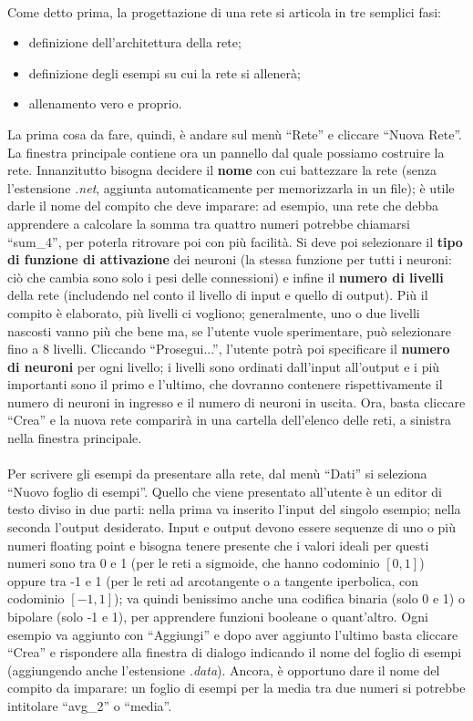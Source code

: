 \documentclass{article}
\begin{document}
\paragraph{} Come detto prima, la progettazione di una rete si articola in tre semplici fasi:
\begin{itemize}
	\item definizione dell'architettura della rete;
	\item definizione degli esempi su cui la rete si allenerà;
	\item allenamento vero e proprio.
\end{itemize}
La prima cosa da fare, quindi, è andare sul menù “Rete” e cliccare “Nuova Rete”. La finestra principale contiene ora un pannello dal quale possiamo costruire la rete. Innanzitutto bisogna decidere il \textbf{nome} con cui battezzare la rete (senza l'estensione \textit{.net}, aggiunta automaticamente per memorizzarla in un file); è utile darle il nome del compito che deve imparare: ad esempio, una rete che debba apprendere a calcolare la somma tra quattro numeri potrebbe chiamarsi “sum\_4”, per poterla ritrovare poi con più facilità. Si deve poi selezionare il \textbf{tipo di funzione di attivazione} dei neuroni (la stessa funzione per tutti i neuroni: ciò che cambia sono solo i pesi delle connessioni) e infine il \textbf{numero di livelli} della rete (includendo nel conto il livello di input e quello di output). Più il compito è elaborato, più livelli ci vogliono; generalmente, uno o due livelli nascosti vanno più che bene ma, se l'utente vuole sperimentare, può selezionare fino a 8 livelli. Cliccando “Prosegui...”, l'utente potrà poi specificare il \textbf{numero di neuroni} per ogni livello; i livelli sono ordinati dall'input all'output e i più importanti sono il primo e l'ultimo, che dovranno contenere rispettivamente il numero di neuroni in ingresso e il numero di neuroni in uscita. Ora, basta cliccare “Crea” e la nuova rete comparirà in una cartella dell'elenco delle reti, a sinistra nella finestra principale.

\paragraph{} Per scrivere gli esempi da presentare alla rete, dal menù “Dati” si seleziona “Nuovo foglio di esempi”. Quello che viene presentato all'utente è un editor di testo diviso in due parti: nella prima va inserito l'input del singolo esempio; nella seconda l'output desiderato. Input e output devono essere sequenze di uno o più numeri floating point e bisogna tenere presente che i valori ideali per questi numeri sono tra 0 e 1 (per le reti a sigmoide, che hanno codominio $[0,1]$) oppure tra -1 e 1 (per le reti ad arcotangente o a tangente iperbolica, con codominio $[-1,1]$); va quindi benissimo anche una codifica binaria (solo 0 e 1) o bipolare (solo -1 e 1), per apprendere funzioni booleane o quant'altro. Ogni esempio va aggiunto con “Aggiungi” e dopo aver aggiunto l'ultimo basta cliccare “Crea” e rispondere alla finestra di dialogo indicando il nome del foglio di esempi (aggiungendo anche l'estensione \textit{.data}). Ancora, è opportuno dare il nome del compito da imparare: un foglio di esempi per la media tra due numeri si potrebbe intitolare “avg\_2” o “media”.
\end{document}
